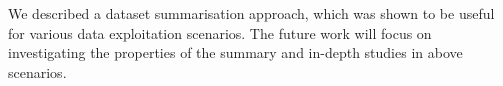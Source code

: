 We described a dataset summarisation approach, which was shown to be useful for various data exploitation scenarios. The future work will focus on investigating the properties of the summary and in-depth studies in above scenarios.

